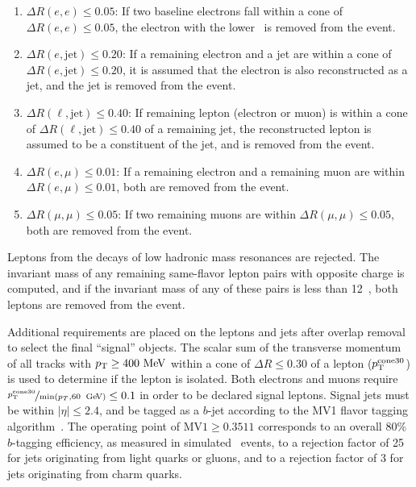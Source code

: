 \begin{enumerate}
  \item $\Delta R(e,e) \le 0.05$: If two baseline electrons fall
    within a cone of $\Delta R(e,e) \le 0.05$, the electron with the
    lower \ET\ is removed from the event.
  \item $\Delta R(e,\mathrm{jet}) \le 0.20$: If a remaining electron and a jet
    are within a cone of $\Delta R(e,\mathrm{jet}) \le 0.20$, it is
    assumed that the electron is also reconstructed as a jet, and the
    jet is removed from the event.
  \item $\Delta R(\ell,\mathrm{jet}) \le 0.40$: If remaining lepton (electron
    or muon) is within a cone of $\Delta R(\ell,\mathrm{jet}) \le 0.40$ of a
    remaining jet, the reconstructed lepton is assumed to be a constituent of
    the jet, and is removed from the event.
  \item $\Delta R(e,\mu) \le 0.01$: If a remaining electron and a remaining muon
    are within $\Delta R(e,\mu) \le 0.01$, both are removed from the event.
  \item $\Delta R(\mu,\mu) \le 0.05$: If two remaining muons are within
    $\Delta R(\mu,\mu) \le 0.05$, both are removed from the event.
\end{enumerate}

Leptons from the decays of low hadronic mass resonances are rejected.
The invariant mass of any remaining same-flavor lepton pairs with opposite
charge is computed, and if the invariant mass of any of these pairs is less
than 12~\GeV, both leptons are removed from the event.

Additional requirements are placed on the leptons and jets after overlap
removal to select the final ``signal'' objects.
The scalar sum of the transverse momentum of all tracks with $\pt \geq 400 \MeV$
within a cone of $\Delta R \leq 0.30$ of a lepton ($p_{\mathrm{T}}^\mathrm{cone30}$) is
used to determine if the lepton is isolated.
Both electrons and muons require
$\nicefrac{\pT^{\mathrm{cone30}}}{\min(p_T, 60\,\GeV)} \leq 0.1$ in order
to be declared signal leptons.
Signal jets must be within $|\eta| \leq 2.4$, and be tagged as a $b$-jet
according to the MV1 flavor tagging
algorithm~\cite{ATLAS-CONF-2014-004, ATLAS-CONF-2014-046}.
The operating point of $\mathrm{MV1} \geq 0.3511$ corresponds to an overall
80\% $b$-tagging efficiency, as measured in simulated \TTBAR\ events, to a
rejection factor of 25 for jets originating from light quarks or gluons, and to
a rejection factor of 3 for jets originating from charm quarks.


